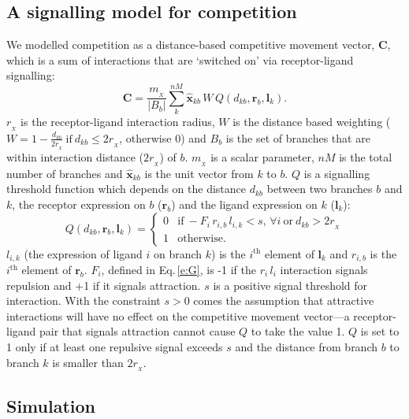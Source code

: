 \documentclass[9pt,lineno]{elife}
\begin{document}
\subsection*{A signalling model for competition}
 
 We modelled competition as a distance-based competitive movement vector, $\mathbf{C}$, which is a sum of interactions that are `switched on' via receptor-ligand signalling:
%
\begin{equation} \label{e:X}
\mathbf{C} = \frac{m_{\!_X}}{|B_{b}|} \sum_k^{nM} \hat{\mathbf{x}}_{kb}\,W\,Q(d_{kb}, \mathbf{r}_{b}, \mathbf{l}_{k}).
\end{equation}
%
$r_{\!_X}$ is the receptor-ligand interaction radius, $W$ is the distance based weighting ($W = 1-\frac{d_{kb}}{2r_{\!_X}}~\mathrm{if}~  d_{kb}\leq 2r_{\!_X}$, otherwise $0$) and $B_{b}$ is the set of branches that are within interaction distance ($2 r_{\!_X}$) of $b$. $m_{\!_X}$ is a scalar parameter, $nM$ is the total number of branches and $\hat{\mathbf{x}}_{kb}$ is the unit vector from $k$ to $b$.
%
$Q$ is a signalling threshold function which depends on the distance $d_{kb}$ between two branches $b$ and $k$, the receptor expression on $b$ ($\mathbf{r}_b$) and the ligand expression on $k$ ($\mathbf{l}_k$):
%
\begin{equation}
Q(d_{kb}, \mathbf{r}_{b}, \mathbf{l}_{k}) = \begin{cases}
                 0 & \mathrm{if}~-F_i\,r_{i,b}\,l_{i,k} <
                 s,\,\forall{i}~\mathrm{or}~d_{kb} > 2r_{\!_X} \\
                 1 & \mathrm{otherwise.}
     \end{cases}
\end{equation}
%
$l_{i,k}$ (the expression of ligand $i$ on branch $k$) is the $i^{\mathrm{th}}$ element of $\mathbf{l}_k$ and $r_{i,b}$ is the $i^{\mathrm{th}}$ element of $\mathbf{r}_b$. 
$F_i$, defined in Eq.\,\ref{e:G}, is -1 if the $r_{i}\,l_{i}$ interaction signals repulsion and +1 if it signals attraction.
$s$ is a positive signal threshold for interaction.
With the constraint $s>0$ comes the assumption that attractive interactions will have no effect on the competitive movement vector---a receptor-ligand pair that signals attraction cannot cause $Q$ to take the value 1. 
$Q$ is set to 1 only if at least one repulsive signal exceeds $s$ and the distance from branch $b$ to branch $k$ is smaller than $2 r_{\!_X}$.

\subsection*{Simulation}
\end{document}
